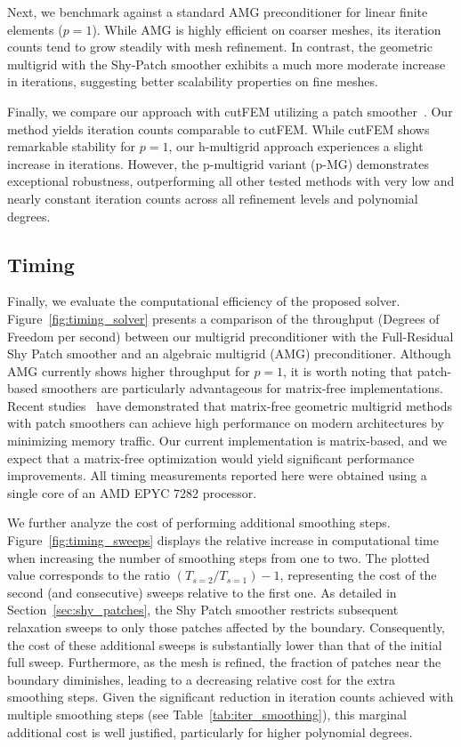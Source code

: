 \documentclass{elsarticle}
\begin{document}
Next, we benchmark against a standard AMG preconditioner for linear finite elements ($p=1$). While AMG is highly
efficient on coarser meshes, its iteration counts tend to grow steadily with mesh refinement. In contrast, the
geometric multigrid with the Shy-Patch smoother exhibits a much more moderate increase in iterations, suggesting better
scalability properties on fine meshes.

Finally, we compare our approach with cutFEM utilizing a patch smoother~\cite{cui2025multigrid}. Our method yields
iteration counts comparable to cutFEM. While cutFEM shows remarkable stability for $p=1$, our h-multigrid approach
experiences a slight increase in iterations. However, the p-multigrid variant (p-MG) demonstrates exceptional
robustness, outperforming all other tested methods with very low and nearly constant iteration counts across all
refinement levels and polynomial degrees.

\subsection{Timing}
Finally, we evaluate the computational efficiency of the proposed solver. Figure~\ref{fig:timing_solver} presents a
comparison of the throughput (Degrees of Freedom per second) between our multigrid preconditioner with the
Full-Residual Shy Patch smoother and an algebraic multigrid (AMG) preconditioner. Although AMG currently shows higher
throughput for $p=1$, it is worth noting that patch-based smoothers are particularly advantageous for matrix-free
implementations. Recent studies~\cite{wichrowski2025smoothers,
    cui2025multigrid,wichrowski2025local,wichrowski2025multigrid} have demonstrated that matrix-free geometric multigrid
methods with patch smoothers can achieve high performance on modern architectures by minimizing memory traffic. Our
current implementation is matrix-based, and we expect that a matrix-free optimization would yield significant
performance improvements. All timing measurements reported here were obtained using a single core of an AMD EPYC 7282
processor.

We further analyze the cost of performing additional smoothing steps. Figure~\ref{fig:timing_sweeps} displays the
relative increase in computational time when increasing the number of smoothing steps from one to two. The plotted
value corresponds to the ratio $(T_{s=2}/T_{s=1}) - 1$, representing the cost of the second (and consecutive) sweeps
relative to the first one. As detailed in Section~\ref{sec:shy_patches}, the Shy Patch smoother restricts subsequent
relaxation sweeps to only those patches affected by the boundary. Consequently, the cost of these additional sweeps is
substantially lower than that of the initial full sweep. Furthermore, as the mesh is refined, the fraction of patches
near the boundary diminishes, leading to a decreasing relative cost for the extra smoothing steps. Given the
significant reduction in iteration counts achieved with multiple smoothing steps (see Table~\ref{tab:iter_smoothing}),
this marginal additional cost is well justified, particularly for higher polynomial degrees.
\end{document}
